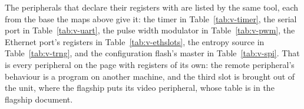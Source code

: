 \documentclass[journal,onecolumn,9pt]{IEEEtran}
\begin{document}
\begin{table}[htbp]
\caption{The peripheral page at , as its bridge decodes
it.}
\label{tab:v-page}
\end{table}

The peripherals that declare their registers with  are
listed by the same tool, each from the base the maps above give it:
the timer in Table~\ref{tab:v-timer}, the serial port in
Table~\ref{tab:v-uart}, the pulse width modulator in
Table~\ref{tab:v-pwm}, the Ethernet port's registers in
Table~\ref{tab:v-ethslots}, the entropy source in
Table~\ref{tab:v-trng}, and the configuration flash's master in
Table~\ref{tab:v-spi}. That is every peripheral on the page with
registers of its own: the remote peripheral's behaviour is a program on
another machine, and the third slot is brought out of the unit, where
the flagship puts its video peripheral, whose table is in the flagship
document.

\begin{table}[htbp]
\caption{The timer's registers.}
\label{tab:v-timer}
\end{table}

\begin{table}[htbp]
\caption{The serial port's registers.}
\label{tab:v-uart}
\end{table}

\begin{table}[htbp]
\caption{The pulse width modulator's registers.}
\label{tab:v-pwm}
\end{table}

\begin{table}[htbp]
\caption{The Ethernet port's registers.}
\label{tab:v-ethslots}
\end{table}

\begin{table}[htbp]
\caption{The entropy source's registers.}
\label{tab:v-trng}
\end{table}

\begin{table}[htbp]
\caption{The configuration flash's SPI master's registers.}
\label{tab:v-spi}
\end{table}
\end{document}
